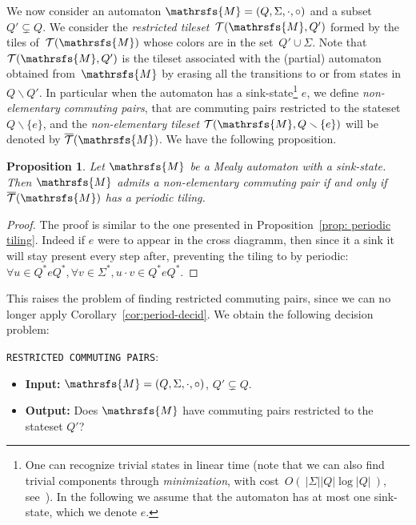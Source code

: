 \documentclass{amsart}
\newtheorem{proposition}[theorem]{Proposition}
\begin{document}
We now consider an automaton ${{{\mathrsfs{{M}}}}}= ({{{Q}}},{{{\Sigma}}},{{{\cdot}}},{{{\circ}}})$ and a subset ${{{Q}}}'\varsubsetneq {{{Q}}}$.  
We consider the \emph{restricted tileset}~$\mathcal{T}({{{\mathrsfs{{M}}}}},{{{Q}}}')$ formed by the tiles of~$\mathcal{T}({{{\mathrsfs{{M}}}}})$ whose colors are in the set~${{{Q}}}'\cup {{{\Sigma}}}$. Note that $\mathcal{T}({{{\mathrsfs{{M}}}}},{{{Q}}}')$ is the tileset associated with the (partial) automaton obtained from~${{{\mathrsfs{{M}}}}}$ by erasing all the transitions  to or from states in~${{{Q}}}\smallsetminus {{{Q}}}'$.
In particular when the automaton has a sink-state\footnote{One can recognize trivial states in linear time (note that we can also find trivial components through \emph{minimization}, with cost~$O(\ |{{{\Sigma}}}||{{{Q}}}|\log|{{{Q}}}|\ )$, see~\cite{BarSil}). In the following we assume that the automaton has at most one sink-state, which we denote $e$.} $e$,  we define \emph{non-elementary commuting pairs}, that are commuting pairs restricted to the stateset~${{{Q}}}\smallsetminus\{e\}$, and  the \emph{non-elementary tileset}  $\mathcal{T}({{{\mathrsfs{{M}}}}},{{{Q}}}\smallsetminus\{e\})$ will be denoted by $\overline{\mathcal{T}}({{{\mathrsfs{{M}}}}})$. We have the following proposition. 

\begin{proposition}\label{prop: reduced tileset}
Let  ${{{\mathrsfs{{M}}}}} $ be a Mealy automaton with a sink-state. Then ${{{\mathrsfs{{M}}}}}$ admits a non-elementary commuting pair if and only if $\overline{\mathcal{T}}({{{\mathrsfs{{M}}}}})$ has a periodic tiling.
\end{proposition}
\begin{proof}
The proof is similar to the one presented in Proposition~\ref{prop: periodic tiling}. Indeed if $e$ were to appear in the cross diagramm, then since it a sink it will stay present  every step after, preventing the tiling to by periodic: $\forall u \in {{{Q}}}^*e{{{Q}}}^*, \forall v \in {{{\Sigma}}}^*, u {{{\cdot}}} v \in {{{Q}}}^*e{{{Q}}}^*$. 
  
\end{proof}

This raises the problem of finding restricted commuting pairs, since we can no longer apply Corollary~\ref{cor:period-decid}. We obtain the following decision problem:\medskip

{{\small\texttt{RESTRICTED\! COMMUTING\! PAIRS}}:}
\begin{itemize}
\item \textbf{Input:} ${{{\mathrsfs{{M}}}}}=({{{Q}}},{{{\Sigma}}},{{{\cdot}}},{{{\circ}}})$, ${{{Q}}}'\varsubsetneq {{{Q}}}$.
\item \textbf{Output:} Does ${{{\mathrsfs{{M}}}}}$ have commuting pairs restricted to the stateset ${{{Q}}}'$?
\end{itemize}
\end{document}
